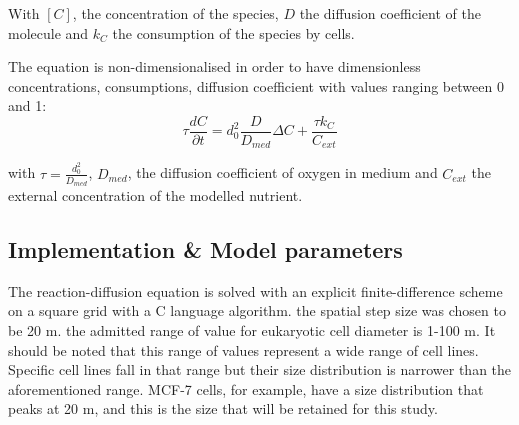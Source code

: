 \documentclass[11pt,a4paper]{article}
\begin{document}
With $[C]$, the concentration of the species, $D$ the diffusion coefficient of the molecule and $k_C$ the consumption of the species by cells. 



The equation is  non-dimensionalised in order to have dimensionless concentrations, consumptions, diffusion coefficient with values ranging between 0 and 1:
\[  \tau \frac{d C}{\partial t}  =   d_0^2 \frac{D}{D_{med}} \Delta C + \frac{\tau k_C}{C_{ext}}  \]

 with $\tau  = \frac{d_0^2}{D_{med}}$, $D_{med}$, the diffusion coefficient of oxygen in medium and $C_{ext}$ the external concentration of the modelled nutrient.\\ %





\subsection{Implementation \& Model parameters}
The reaction-diffusion equation is solved with an explicit finite-difference scheme on a square grid with a C language algorithm. the spatial step size was chosen to be 20 \textmu m. the admitted range of value for eukaryotic cell diameter is 1-100 \textmu m.\cite{Cooper2006} It should be noted that this  range of values represent a wide range of cell lines. Specific cell lines fall in  that range but their size distribution is narrower than the aforementioned range. MCF-7 cells, for example,  have a size distribution that peaks at 20 \textmu m,\cite{Moon2013} and this is the size that will be retained for this study.\\
\end{document}
